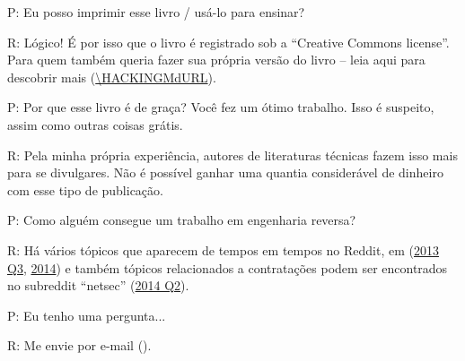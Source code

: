 \par P: Eu posso imprimir esse livro / usá-lo para ensinar?
\par R: Lógico! É por isso que o livro é registrado sob a “Creative Commons license”. Para quem também queria fazer sua própria versão do livro – leia aqui para descobrir mais (\url{\HACKINGMdURL}).

\par P: Por que esse livro é de graça? Você fez um ótimo trabalho. Isso é suspeito, assim como outras coisas grátis.
\par R: Pela minha própria experiência, autores de literaturas técnicas fazem isso mais para se divulgares. Não é possível ganhar uma quantia considerável de dinheiro com esse tipo de publicação.

\par P: Como alguém consegue um trabalho em engenharia reversa?
\par R: Há vários tópicos que aparecem de tempos em tempos no Reddit\FNURLREDDIT{}, em (\href{http://go.yurichev.com/17333}{2013 Q3}, \href{http://go.yurichev.com/17334}{2014}) 
e também tópicos relacionados a contratações podem ser encontrados no subreddit ``netsec'' (\href{http://go.yurichev.com/17335}{2014 Q2}).

\par P: Eu tenho uma pergunta...
\par R: Me envie por e-mail (\EMAIL).

\fi %

